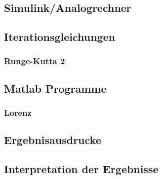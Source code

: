 \documentclass[10pt]{scrartcl}
\begin{document}
	\subsection{Simulink/Analogrechner}
	
	\subsection{Iterationsgleichungen}
		\subsubsection{Runge-Kutta 2}

	\subsection{Matlab Programme}
		\subsubsection{Lorenz}			

	\subsection{Ergebnisausdrucke}	
		
	\subsection{Interpretation der Ergebnisse}				
\end{document}
